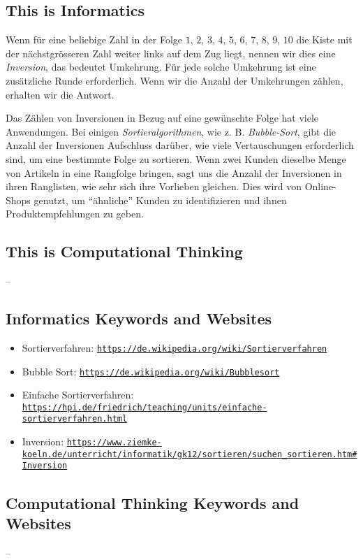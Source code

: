 \documentclass[a4paper,11pt]{report}
\newcommand{\BrochureUrlText}[1]{\texttt{#1}}
\begin{document}
\subsection*{This is Informatics}

Wenn für eine beliebige Zahl in der Folge $1$, $2$, $3$, $4$, $5$, $6$, $7$, $8$, $9$, $10$ die Kiste mit der nächstgrösseren Zahl weiter links auf dem Zug liegt, nennen wir dies eine \emph{Inversion}, das bedeutet Umkehrung. Für jede solche Umkehrung ist eine zusätzliche Runde erforderlich. Wenn wir die Anzahl der Umkehrungen zählen, erhalten wir die Antwort.

Das Zählen von Inversionen in Bezug auf eine gewünschte Folge hat viele Anwendungen. Bei einigen \emph{Sortieralgorithmen}, wie z. B. \emph{Bubble-Sort}, gibt die Anzahl der Inversionen Aufschluss darüber, wie viele Vertauschungen erforderlich sind, um eine bestimmte Folge zu sortieren. Wenn zwei Kunden dieselbe Menge von Artikeln in eine Rangfolge bringen, sagt uns die Anzahl der Inversionen in ihren Ranglisten, wie sehr sich ihre Vorlieben gleichen. Dies wird von Online-Shops genutzt, um \enquote{ähnliche} Kunden zu identifizieren und ihnen Produktempfehlungen zu geben.


\subsection*{This is Computational Thinking}

–


\subsection*{Informatics Keywords and Websites}

\begin{itemize}
  \item Sortierverfahren: \href{https://de.wikipedia.org/wiki/Sortierverfahren}{\BrochureUrlText{https://de.wikipedia.org/wiki/Sortierverfahren}}
  \item Bubble Sort: \href{https://de.wikipedia.org/wiki/Bubblesort}{\BrochureUrlText{https://de.wikipedia.org/wiki/Bubblesort}}
  \item Einfache Sortierverfahren: \href{https://hpi.de/friedrich/teaching/units/einfache-sortierverfahren.html}{\BrochureUrlText{https://hpi.de/friedrich/teaching/units/einfache-sortierverfahren.html}}
  \item Inversion: \href{https://www.ziemke-koeln.de/unterricht/informatik/gk12/sortieren/suchen_sortieren.htm\#Inversion}{\BrochureUrlText{https://www.ziemke-koeln.de/unterricht/informatik/gk12/sortieren/suchen\_sortieren.htm\#Inversion}}
\end{itemize}


\subsection*{Computational Thinking Keywords and Websites}

–
\end{document}

